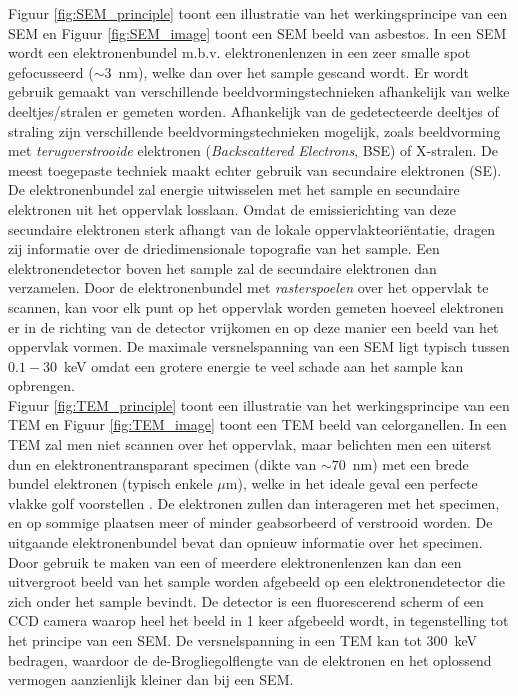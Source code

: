 \documentclass[we,twoside,openright,a4paper,11pt]{uantwerpenbamathesis}
\begin{document}
Figuur \ref{fig:SEM_principle} toont een illustratie van het werkingsprincipe van een SEM en Figuur \ref{fig:SEM_image} toont een SEM beeld van asbestos. In een SEM wordt een elektronenbundel m.b.v. elektronenlenzen in een zeer smalle spot gefocusseerd ($\sim 3$~nm), welke dan over het sample gescand wordt. Er wordt gebruik gemaakt van verschillende beeldvormingstechnieken afhankelijk van welke deeltjes/stralen er gemeten worden. Afhankelijk van de gedetecteerde deeltjes of straling zijn verschillende beeldvormingstechnieken mogelijk, zoals beeldvorming met \textit{terugverstrooide} elektronen (\textit{Backscattered Electrons}, BSE) of X-stralen. De meest toegepaste techniek maakt echter gebruik van secundaire elektronen (SE). De elektronenbundel zal energie uitwisselen met het sample en secundaire elektronen uit het oppervlak losslaan. Omdat de emissierichting van deze secundaire elektronen sterk afhangt van de lokale oppervlakteoriëntatie, dragen zij informatie over de driedimensionale topografie van het sample. Een elektronendetector boven het sample zal de secundaire elektronen dan verzamelen. Door de elektronenbundel met \textit{rasterspoelen} over het oppervlak te scannen, kan voor elk punt op het oppervlak worden gemeten hoeveel elektronen er in de richting van de detector vrijkomen en op deze manier een beeld van het oppervlak vormen. De maximale versnelspanning van een SEM ligt typisch tussen $0.1-30$~keV \cite{PWHawkes} omdat een grotere energie te veel schade aan het sample kan opbrengen.\\

Figuur \ref{fig:TEM_principle} toont een illustratie van het werkingsprincipe van een TEM en Figuur \ref{fig:TEM_image} toont een TEM beeld van celorganellen. In een TEM zal men niet scannen over het oppervlak, maar belichten men een uiterst dun en elektronentransparant specimen (dikte van $\sim70$~nm) met een brede bundel elektronen (typisch enkele $\mu$m), welke in het ideale geval een perfecte vlakke golf voorstellen \cite{MyscopeCourse}. De elektronen zullen dan interageren met het specimen, en op sommige plaatsen meer of minder geabsorbeerd of verstrooid worden. De uitgaande elektronenbundel bevat dan opnieuw informatie over het specimen. Door gebruik te maken van een of meerdere elektronenlenzen kan dan een uitvergroot beeld van het sample worden afgebeeld op een elektronendetector die zich onder het sample bevindt. De detector is een fluorescerend scherm of een CCD camera waarop heel het beeld in 1 keer afgebeeld wordt, in tegenstelling tot het principe van een SEM. De versnelspanning in een TEM kan tot $300$~keV bedragen, waardoor de de-Brogliegolflengte van de elektronen en het oplossend vermogen aanzienlijk kleiner dan bij een SEM.
\end{document}
